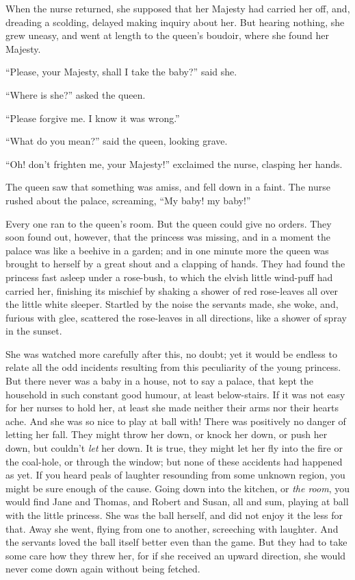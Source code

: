 \documentclass[12pt]{memoir}
\begin{document}
When the nurse returned, she supposed that her Majesty had carried her
off, and, dreading a scolding, delayed making inquiry about her.  But
hearing nothing, she grew uneasy, and went at length to the queen's
boudoir, where she found her Majesty.

``Please, your Majesty, shall I take the baby?'' said she.

``Where is she?'' asked the queen.

``Please forgive me.  I know it was wrong.''

``What do you mean?'' said the queen, looking grave.

``Oh! don't frighten me, your Majesty!'' exclaimed the nurse, clasping
her hands.

The queen saw that something was amiss, and fell down in a faint.  The
nurse rushed about the palace, screaming, ``My baby! my baby!''

Every one ran to the queen's room.  But the queen could give no
orders.  They soon found out, however, that the princess was missing,
and in a moment the palace was like a beehive in a garden; and in one
minute more the queen was brought to herself by a great shout and a
clapping of hands.  They had found the princess fast asleep under a
rose-bush, to which the elvish little wind-puff had carried her,
finishing its mischief by shaking a shower of red rose-leaves all over
the little white sleeper.  Startled by the noise the servants made,
she woke, and, furious with glee, scattered the rose-leaves in all
directions, like a shower of spray in the sunset.

She was watched more carefully after this, no doubt; yet it would be
endless to relate all the odd incidents resulting from this
peculiarity of the young princess.  But there never was a baby in a
house, not to say a palace, that kept the household in such constant
good humour, at least below-stairs.  If it was not easy for her nurses
to hold her, at least she made neither their arms nor their hearts
ache.  And she was so nice to play at ball with!  There was positively
no danger of letting her fall.  They might throw her down, or knock
her down, or push her down, but couldn't \emph{let} her down.  It is
true, they might let her fly into the fire or the coal-hole, or
through the window; but none of these accidents had happened as yet.
If you heard peals of laughter resounding from some unknown region,
you might be sure enough of the cause.  Going down into the kitchen,
or \emph{the room}, you would find Jane and Thomas, and Robert and
Susan, all and sum, playing at ball with the little princess.  She was
the ball herself, and did not enjoy it the less for that.  Away she
went, flying from one to another, screeching with laughter.  And the
servants loved the ball itself better even than the game.  But they
had to take some care how they threw her, for if she received an
upward direction, she would never come down again without being
fetched.
\end{document}
